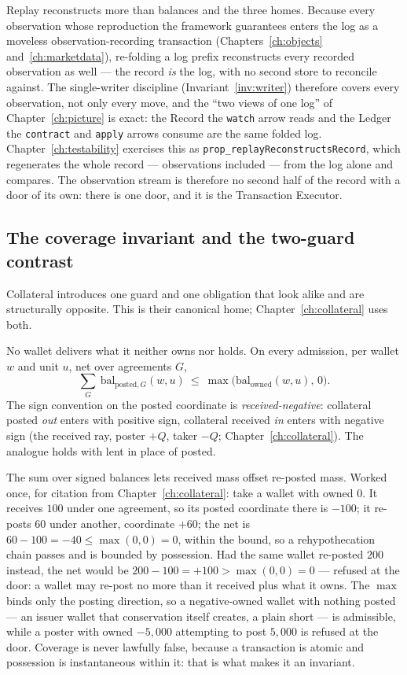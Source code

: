 Replay reconstructs more than balances and the three homes. Because every observation
whose reproduction the framework guarantees enters the log as a moveless
observation-recording transaction (Chapters~\ref{ch:objects} and~\ref{ch:marketdata}),
re-folding a log prefix reconstructs every recorded observation as well --- the record
\emph{is} the log, with no second store to reconcile against. The single-writer
discipline (Invariant~\ref{inv:writer}) therefore covers every observation, not only
every move, and the ``two views of one log'' of Chapter~\ref{ch:picture} is exact: the
Record the \texttt{watch} arrow reads and the Ledger the \texttt{contract} and
\texttt{apply} arrows consume are the same folded log. Chapter~\ref{ch:testability}
exercises this as \texttt{prop\_replayReconstructsRecord}, which regenerates the whole
record --- observations included --- from the log alone and compares. The observation
stream is therefore no second half of the record with a door of its own: there is one door,
and it is the Transaction Executor.

\subsection{The coverage invariant and the two-guard contrast}

Collateral introduces one guard and one obligation that look alike and are
structurally opposite. This is their canonical home; Chapter~\ref{ch:collateral}
uses both.

\begin{invariant}\label{inv:coverage}
No wallet delivers what it neither owns nor holds. On every admission, per wallet
$w$ and unit $u$, net over agreements $G$,
\[
\sum_{G}\ \mathrm{bal}_{\mathrm{posted},G}(w,u)\ \le\ \max\bigl(\mathrm{bal}_{\mathrm{owned}}(w,u),\,0\bigr).
\]
The sign convention on the posted coordinate is \emph{received-negative}:
collateral posted \emph{out} enters with positive sign, collateral received
\emph{in} enters with negative sign (the received ray, poster $+Q$, taker $-Q$;
Chapter~\ref{ch:collateral}). The analogue holds with lent in place of posted.
\end{invariant}

The sum over signed balances lets received mass offset re-posted mass. Worked once,
for citation from Chapter~\ref{ch:collateral}: take a wallet with owned $0$. It
receives $100$ under one agreement, so its posted coordinate there is $-100$; it
re-posts $60$ under another, coordinate $+60$; the net is $60-100=-40\le\max(0,0)=0$,
within the bound, so a rehypothecation chain passes and is bounded by possession.
Had the same wallet re-posted $200$ instead, the net would be $200-100=+100>\max(0,0)=0$
--- refused at the door: a wallet may re-post no more than it received plus what it
owns. The $\max$ binds only the posting direction, so a negative-owned
wallet with nothing posted --- an issuer wallet that conservation itself creates,
a plain short --- is admissible, while a poster with owned $-5{,}000$ attempting to
post $5{,}000$ is refused at the door. Coverage is never lawfully false, because a
transaction is atomic and possession is instantaneous within it: that is what
makes it an invariant.

